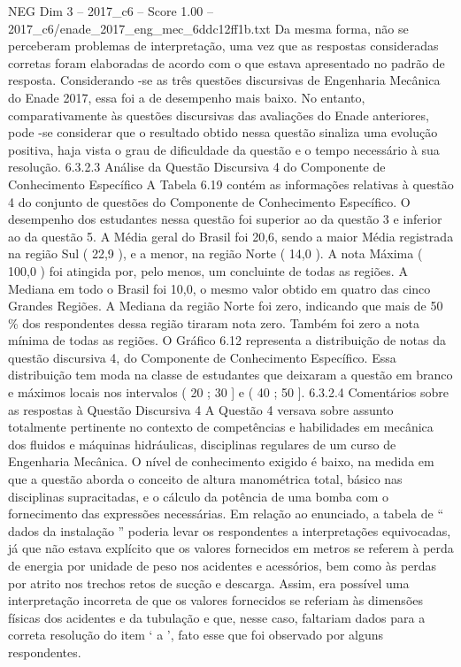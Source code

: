 \begin{textsample}{NEG Dim 3 – 2017\_c6 – Score 1.00 – 2017\_c6/enade\_2017\_eng\_mec\_6ddc12ff1b.txt}
Da mesma forma, não se perceberam problemas de interpretação, uma vez que as respostas consideradas corretas foram elaboradas de acordo com o que estava apresentado no padrão de resposta.
Considerando -se as três questões discursivas de Engenharia Mecânica do Enade 2017, essa foi a de desempenho mais baixo.
No entanto, comparativamente às questões discursivas das avaliações do Enade anteriores, pode -se considerar que o resultado obtido nessa questão sinaliza uma evolução positiva, haja vista o grau de dificuldade da questão e o tempo necessário à sua resolução. 6.3.2.3 Análise da Questão Discursiva 4 do Componente de Conhecimento Específico A Tabela 6.19 contém as informações relativas à questão 4 do conjunto de questões do Componente de Conhecimento Específico.
O desempenho dos estudantes nessa questão foi superior ao da questão 3 e inferior ao da questão 5.
A Média geral do Brasil foi 20,6, sendo a maior Média registrada na região Sul ( 22,9 ), e a menor, na região Norte ( 14,0 ).
A nota Máxima ( 100,0 ) foi atingida por, pelo menos, um concluinte de todas as regiões.
A Mediana em todo o Brasil foi 10,0, o mesmo valor obtido em quatro das cinco Grandes Regiões.
A Mediana da região Norte foi zero, indicando que mais de 50 \% dos respondentes dessa região tiraram nota zero.
Também foi zero a nota mínima de todas as regiões.
O Gráfico 6.12 representa a distribuição de notas da questão discursiva 4, do Componente de Conhecimento Específico.
Essa distribuição tem moda na classe de estudantes que deixaram a questão em branco e máximos locais nos intervalos ( 20 ; 30 ] e ( 40 ; 50 ]. 6.3.2.4 Comentários sobre as respostas à Questão Discursiva 4 A Questão 4 versava sobre assunto totalmente pertinente no contexto de competências e habilidades em mecânica dos fluidos e máquinas hidráulicas, disciplinas regulares de um curso de Engenharia Mecânica.
O nível de conhecimento exigido é baixo, na medida em que a questão aborda o conceito de altura manométrica total, básico nas disciplinas supracitadas, e o cálculo da potência de uma bomba com o fornecimento das expressões necessárias.
Em relação ao enunciado, a tabela de “ dados da instalação ” poderia levar os respondentes a interpretações equivocadas, já que não estava explícito que os valores fornecidos em metros se referem à perda de energia por unidade de peso nos acidentes e acessórios, bem como às perdas por atrito nos trechos retos de sucção e descarga.
Assim, era possível uma interpretação incorreta de que os valores fornecidos se referiam às dimensões físicas dos acidentes e da tubulação e que, nesse caso, faltariam dados para a correta resolução do item ‘ a ’, fato esse que foi observado por alguns respondentes.

\end{textsample}
